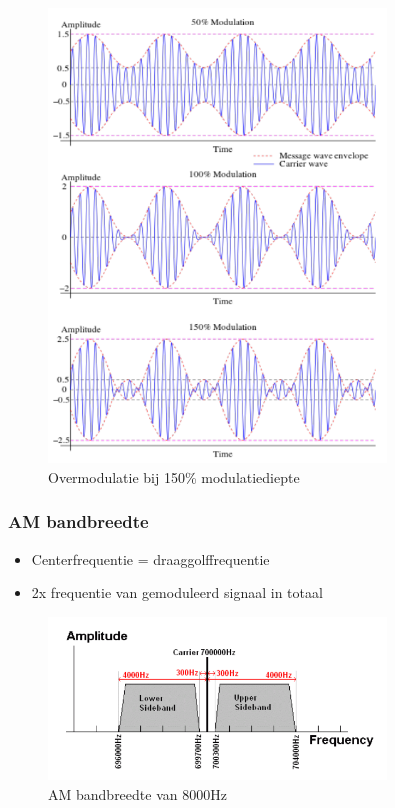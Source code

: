 \documentclass{article}
\begin{document}
\begin{figure}[H]
    \centering
    \includegraphics[width=0.8\textwidth]{Screenshot_20200302_120354.png}
    \caption{Overmodulatie bij 150\% modulatiediepte}
\end{figure}

\subsubsection{AM bandbreedte}
\begin{itemize}
    \item Centerfrequentie = draaggolffrequentie
    \item 2x frequentie van gemoduleerd signaal in totaal
\end{itemize}

\begin{figure}[H]
    \centering
    \includegraphics[width=0.8\textwidth]{Screenshot_20200302_120508.png}
    \caption{AM bandbreedte van 8000Hz}
\end{figure}
\end{document}
